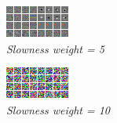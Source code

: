 \documentclass[12pt,a4paper]{report}
\begin{document}
\begin{figure}[h]
\centering
\includegraphics[scale=\scale]{SF50.png}
\caption{ \emph{Slowness weight = 5}}
\end{figure} 

\begin{figure}[h]
\centering
\includegraphics[scale=\scale]{SF100.png}
\caption{ \emph{Slowness weight = 10}}
\end{figure} 
\end{document}
